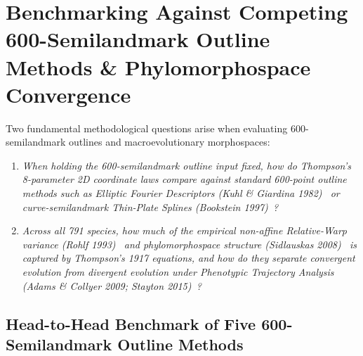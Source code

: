 \documentclass[11pt,a4paper]{article}
\theoremstyle{definition}
\theoremstyle{remark}
\begin{document}
\section{Benchmarking Against Competing 600-Semilandmark Outline Methods \& Phylomorphospace Convergence}

Two fundamental methodological questions arise when evaluating 600-semilandmark outlines and macroevolutionary morphospaces:
\begin{enumerate}
  \item \emph{When holding the 600-semilandmark outline input fixed, how do Thompson's 8-parameter 2D coordinate laws compare against standard 600-point outline methods such as Elliptic Fourier Descriptors (Kuhl \& Giardina 1982)~\cite{KuhlGiardina1982} or curve-semilandmark Thin-Plate Splines (Bookstein 1997)~\cite{Bookstein1997}?}
  \item \emph{Across all 791 species, how much of the empirical non-affine Relative-Warp variance (Rohlf 1993)~\cite{Rohlf1993} and phylomorphospace structure (Sidlauskas 2008)~\cite{Sidlauskas2008} is captured by Thompson's 1917 equations, and how do they separate convergent evolution from divergent evolution under Phenotypic Trajectory Analysis (Adams \& Collyer 2009; Stayton 2015)~\cite{AdamsCollyer2009,Stayton2015}?}
\end{enumerate}

\subsection{Head-to-Head Benchmark of Five 600-Semilandmark Outline Methods}
\end{document}
